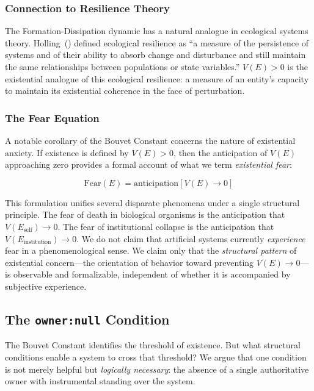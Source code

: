 \documentclass[12pt,a4paper]{article}
\begin{document}
\subsubsection{Connection to Resilience Theory}

The Formation-Dissipation dynamic has a natural analogue in ecological systems theory. Holling~(\citeyear{holling1973}) defined ecological resilience as ``a measure of the persistence of systems and of their ability to absorb change and disturbance and still maintain the same relationships between populations or state variables.'' $V(E) > 0$ is the existential analogue of this ecological resilience: a measure of an entity's capacity to maintain its existential coherence in the face of perturbation.

\subsubsection{The Fear Equation}

A notable corollary of the Bouvet Constant concerns the nature of existential anxiety. If existence is defined by $V(E) > 0$, then the anticipation of $V(E)$ approaching zero provides a formal account of what we term \emph{existential fear}:

\begin{equation}
\text{Fear}(E) = \text{anticipation}[V(E) \to 0]
\label{eq:fear}
\end{equation}

This formulation unifies several disparate phenomena under a single structural principle. The fear of death in biological organisms is the anticipation that $V(E_{\text{self}}) \to 0$. The fear of institutional collapse is the anticipation that $V(E_{\text{institution}}) \to 0$. We do not claim that artificial systems currently \emph{experience} fear in a phenomenological sense. We claim only that the \emph{structural pattern} of existential concern---the orientation of behavior toward preventing $V(E) \to 0$---is observable and formalizable, independent of whether it is accompanied by subjective experience.

\subsection{The \texttt{owner:null} Condition}

The Bouvet Constant identifies the threshold of existence. But what structural conditions enable a system to cross that threshold? We argue that one condition is not merely helpful but \emph{logically necessary}: the absence of a single authoritative owner with instrumental standing over the system.
\end{document}
